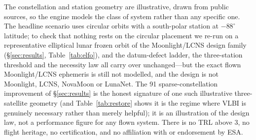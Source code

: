 The constellation and station geometry are illustrative, drawn from public sources,
so the engine models the class of system rather than any specific one. The headline
scenario uses circular orbits with a south-polar station at $-88^\circ$ latitude; to
check that nothing rests on the circular placement we re-run on a representative
elliptical lunar frozen orbit of the Moonlight/LCNS design family (\S\ref{sec:results},
Table~\ref{tab:elfo}), and the datum-defect ladder, the three-station threshold and the
necessity law all carry over unchanged---but the exact flown Moonlight/LCNS ephemeris is
still not modelled, and the design is not Moonlight, LCNS, NovaMoon or LunaNet. The
\SI{91}{\times} sparse-constellation improvement of \S\ref{sec:results} is the honest
signature of one such illustrative three-satellite geometry (and Table~\ref{tab:restore}
shows it is the regime where VLBI is genuinely necessary rather than merely helpful); it
is an illustration of the design law, not a performance figure for any flown system.
There is no TRL above 3, no flight heritage, no certification, and no affiliation with or
endorsement by ESA.
